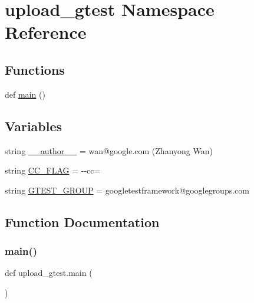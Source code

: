 \hypertarget{namespaceupload__gtest}{}\section{upload\+\_\+gtest Namespace Reference}
\label{namespaceupload__gtest}
\subsection*{Functions}
\begin{DoxyCompactItemize}
\item 
def \mbox{\hyperlink{namespaceupload__gtest_ab5bef7b968c54c632a52c1b4a3d37bdd}{main}} ()
\end{DoxyCompactItemize}
\subsection*{Variables}
\begin{DoxyCompactItemize}
\item 
string \mbox{\hyperlink{namespaceupload__gtest_ae7f6ee6ec8f85faa6fb72465afce7c0d}{\+\_\+\+\_\+author\+\_\+\+\_\+}} = \textquotesingle{}wan@google.\+com (Zhanyong Wan)\textquotesingle{}
\item 
string \mbox{\hyperlink{namespaceupload__gtest_a83f0946f9ee3731253fc622acd581fc2}{C\+C\+\_\+\+F\+L\+AG}} = \textquotesingle{}-\/-\/cc=\textquotesingle{}
\item 
string \mbox{\hyperlink{namespaceupload__gtest_af282f4c60bf6069ed0abf4e06d9b70ab}{G\+T\+E\+S\+T\+\_\+\+G\+R\+O\+UP}} = \textquotesingle{}googletestframework@googlegroups.\+com\textquotesingle{}
\end{DoxyCompactItemize}


\subsection{Function Documentation}
\mbox{\label{namespaceupload__gtest_ab5bef7b968c54c632a52c1b4a3d37bdd}} 
\subsubsection{\texorpdfstring{main()}{main()}}
{\footnotesize\ttfamily def upload\+\_\+gtest.\+main (\begin{DoxyParamCaption}{ }\end{DoxyParamCaption})}



